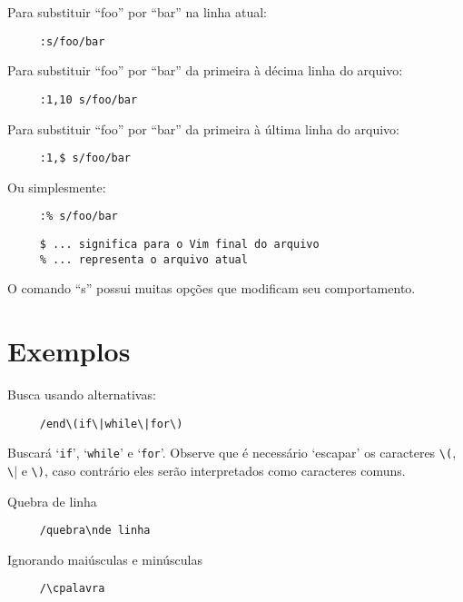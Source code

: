 Para substituir ``foo'' por ``bar'' na linha atual:

\begin{verbatim}
     :s/foo/bar
\end{verbatim}

Para substituir ``foo'' por ``bar'' da primeira à décima linha do arquivo:

\begin{verbatim}
     :1,10 s/foo/bar
\end{verbatim}

Para substituir ``foo'' por ``bar'' da primeira à última linha do arquivo:

\begin{verbatim}
     :1,$ s/foo/bar
\end{verbatim}

Ou simplesmente:

\begin{verbatim}
     :% s/foo/bar
\end{verbatim}

\begin{verbatim}
     $ ... significa para o Vim final do arquivo
     % ... representa o arquivo atual
\end{verbatim}

O comando ``s'' possui muitas opções que modificam seu comportamento.

\section{Exemplos }
\label{Exemplos }

Busca usando alternativas:

\begin{verbatim}
     /end\(if\|while\|for\)
\end{verbatim}

Buscará `{\tt if}', `{\tt while}' e `{\tt for}'.  Observe que é necessário `escapar' os
caracteres \verb|\(|, \verb|\|| e \verb|\)|, caso contrário eles serão
interpretados como caracteres comuns.

Quebra de linha

\begin{verbatim}
     /quebra\nde linha
\end{verbatim}

Ignorando maiúsculas e minúsculas

\begin{verbatim}
     /\cpalavra
\end{verbatim}

